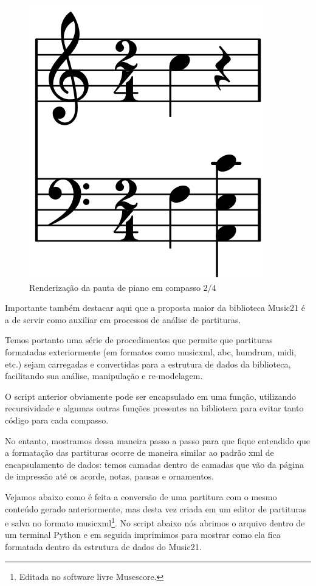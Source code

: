 \documentclass[
	12pt,				%
	openright,			%
	twoside,			%
	a4paper,			%
	english,			%
	french,				%
	spanish,			%
	brazil				%
	]{abntex2}
\begin{document}
\begin{figure}[!h]
	\caption{\label{fig_grafico} Renderização da pauta de piano em compasso $2/4$} 
	\begin{center}
	    \includegraphics[scale=0.25]{estudosM21/pautaM21.png}
	\end{center}
\end{figure}

Importante também destacar aqui que a proposta maior da biblioteca Music21 é a de servir como auxiliar em processos de análise de partituras. 

Temos portanto uma série de procedimentos que permite que partituras formatadas exteriormente (em formatos como musicxml, abc, humdrum, midi, etc.) sejam carregadas e convertidas para a estrutura de dados da biblioteca, facilitando sua análise, manipulação e re-modelagem. 

O script anterior obviamente pode ser encapsulado em uma função, utilizando recursividade e algumas outras funções presentes na biblioteca para evitar tanto código para cada compasso. 

No entanto, mostramos dessa maneira passo a passo para que fique entendido que a formatação das partituras ocorre de maneira similar ao padrão xml de encapsulamento de dados: temos camadas dentro de camadas que vão da página de impressão até os acorde, notas, pausas e ornamentos.

Vejamos abaixo como é feita a conversão de uma partitura com o mesmo conteúdo gerado anteriormente, mas desta vez criada em um editor de partituras e salva no formato musicxml\footnote{Editada no software livre Musescore.}. No script abaixo nós abrimos o arquivo dentro de um terminal Python e em seguida imprimimos para mostrar como ela fica formatada dentro da estrutura de dados do Music21.
\end{document}
